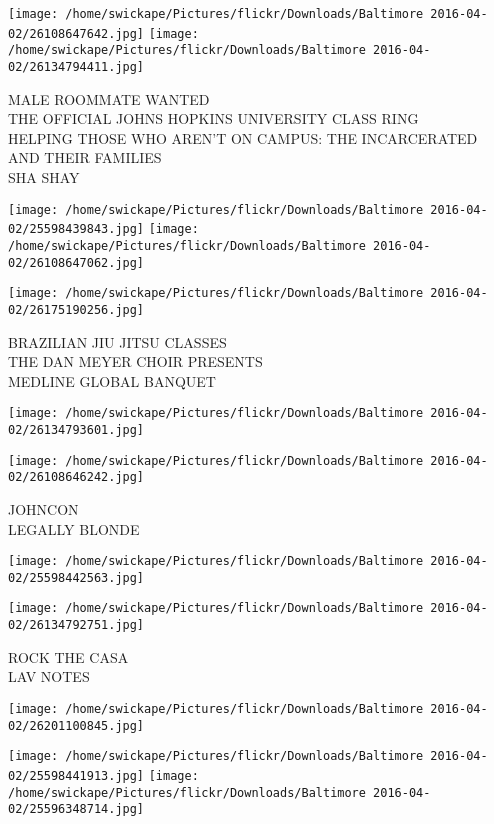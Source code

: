 \documentclass[10pt,letterpaper]{article}
\begin{document}
\texttt{[image: /home/swickape/Pictures/flickr/Downloads/Baltimore 2016-04-02/26108647642.jpg]}
\texttt{[image: /home/swickape/Pictures/flickr/Downloads/Baltimore 2016-04-02/26134794411.jpg]}

MALE ROOMMATE WANTED\\
THE OFFICIAL JOHNS HOPKINS UNIVERSITY CLASS RING\\
HELPING THOSE WHO AREN'T ON CAMPUS: THE INCARCERATED AND THEIR FAMILIES\\
SHA SHAY
\pagebreak

\texttt{[image: /home/swickape/Pictures/flickr/Downloads/Baltimore 2016-04-02/25598439843.jpg]}
\texttt{[image: /home/swickape/Pictures/flickr/Downloads/Baltimore 2016-04-02/26108647062.jpg]}

\vspace{0.25in}
\texttt{[image: /home/swickape/Pictures/flickr/Downloads/Baltimore 2016-04-02/26175190256.jpg]}

BRAZILIAN JIU JITSU CLASSES\\
THE DAN MEYER CHOIR PRESENTS\\
MEDLINE GLOBAL BANQUET
\pagebreak

\texttt{[image: /home/swickape/Pictures/flickr/Downloads/Baltimore 2016-04-02/26134793601.jpg]}

\vspace{0.25in}
\texttt{[image: /home/swickape/Pictures/flickr/Downloads/Baltimore 2016-04-02/26108646242.jpg]}

JOHNCON\\
LEGALLY BLONDE
\pagebreak

\texttt{[image: /home/swickape/Pictures/flickr/Downloads/Baltimore 2016-04-02/25598442563.jpg]}

\vspace{0.25in}
\texttt{[image: /home/swickape/Pictures/flickr/Downloads/Baltimore 2016-04-02/26134792751.jpg]}

ROCK THE CASA\\
LAV NOTES
\pagebreak

\texttt{[image: /home/swickape/Pictures/flickr/Downloads/Baltimore 2016-04-02/26201100845.jpg]}

\vspace{0.25in}
\texttt{[image: /home/swickape/Pictures/flickr/Downloads/Baltimore 2016-04-02/25598441913.jpg]}
\texttt{[image: /home/swickape/Pictures/flickr/Downloads/Baltimore 2016-04-02/25596348714.jpg]}
\end{document}
